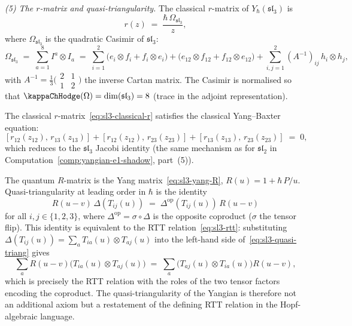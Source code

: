 \begin{example}
\medskip
\noindent\emph{(5) The $r$-matrix and quasi-triangularity.}
The classical $r$-matrix of $Y_\hbar(\mathfrak{sl}_3)$ is
\begin{equation}\label{eq:sl3-classical-r}
r(z)
\;=\;
\frac{\hbar\,\Omega_{\mathfrak{sl}_3}}{z},
\end{equation}
where $\Omega_{\mathfrak{sl}_3}$ is the quadratic Casimir
of $\mathfrak{sl}_3$:
\begin{equation}\label{eq:sl3-casimir}
\Omega_{\mathfrak{sl}_3}
\;=\;
\sum_{a=1}^{8}I^a\otimes I_a
\;=\;
\sum_{i=1}^{2}
\bigl(e_i\otimes f_i + f_i\otimes e_i\bigr)
+ \bigl(e_{12}\otimes f_{12} + f_{12}\otimes e_{12}\bigr)
+ \sum_{i,j=1}^{2}(A^{-1})_{ij}\,h_i\otimes h_j,
\end{equation}
with $A^{-1} = \frac{1}{3}\bigl(\begin{smallmatrix}2&1\\1&2\end{smallmatrix}\bigr)$ the inverse Cartan matrix. The Casimir is normalised so that
$\kappaChHodge(\Omega) = \dim(\mathfrak{sl}_3) = 8$
(trace in the adjoint representation).

The classical $r$-matrix~\eqref{eq:sl3-classical-r}
satisfies the classical Yang--Baxter equation:
\begin{equation}\label{eq:sl3-cybe}
[r_{12}(z_{12}),\,r_{13}(z_{13})]
+ [r_{12}(z_{12}),\,r_{23}(z_{23})]
+ [r_{13}(z_{13}),\,r_{23}(z_{23})]
\;=\;0,
\end{equation}
which reduces to the $\mathfrak{sl}_3$ Jacobi identity
(the same mechanism as for $\mathfrak{sl}_2$ in
Computation~\ref{comp:yangian-e1-shadow}, part~(5)).

The quantum $R$-matrix is the Yang
matrix~\eqref{eq:sl3-yang-R},
$R(u) = 1 + \hbar\,P/u$. Quasi-triangularity at leading
order in $\hbar$ is the identity
\begin{equation}\label{eq:sl3-quasi-triang}
R(u{-}v)\,\Delta(T_{ij}(u))
\;=\;
\Delta^{\mathrm{op}}(T_{ij}(u))\,R(u{-}v)
\end{equation}
for all $i,j\in\{1,2,3\}$, where
$\Delta^{\mathrm{op}} = \sigma\circ\Delta$ is the opposite
coproduct ($\sigma$ the tensor flip). This identity is
equivalent to the RTT relation~\eqref{eq:sl3-rtt}:
substituting $\Delta(T_{ij}(u)) = \sum_a T_{ia}(u)\otimes T_{aj}(u)$
into the left-hand side of~\eqref{eq:sl3-quasi-triang} gives
\[
\sum_a R(u{-}v)\bigl(T_{ia}(u)\otimes T_{aj}(u)\bigr)
\;=\;
\sum_a \bigl(T_{aj}(u)\otimes T_{ia}(u)\bigr)R(u{-}v),
\]
which is precisely the RTT relation with the roles of the
two tensor factors encoding the coproduct. The
quasi-triangularity of the Yangian is therefore not an
additional axiom but a restatement of the defining RTT
relation in the Hopf-algebraic language.


\end{example}
